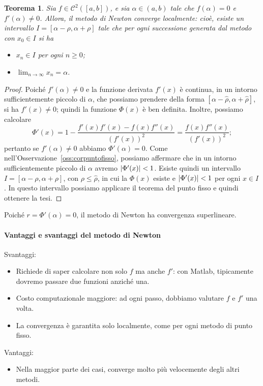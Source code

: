 \documentclass[a4paper]{report}
\DeclarePairedDelimiter{\abs}{\lvert}{\rvert}
\newtheorem{theorem}{Teorema}[chapter]
\theoremstyle{definiton}
\theoremstyle{remark}
\begin{document}
\begin{theorem}
Sia $f \in \mathcal{C}^2([a,b])$, e sia $\alpha \in (a,b)$ tale che $f(\alpha) = 0$ e $f'(\alpha) \neq 0$. Allora, il metodo di Newton converge localmente: cioè, esiste un intervallo $I = [\alpha - \rho,\alpha + \rho]$ tale che per ogni successione generata dal metodo con $x_0 \in I$ si ha
\begin{itemize}
    \item $x_n \in I$ per ogni $n\geq 0$;
    \item $\lim_{n\to \infty } x_n = \alpha$.
\end{itemize}
\end{theorem}
\begin{proof}
Poiché $f'(\alpha) \neq 0$ e la funzione derivata $f'(x)$ è continua, in un intorno sufficientemente piccolo di $\alpha$, che possiamo prendere della forma $[\alpha-\hat{\rho}, \alpha+\hat{\rho}]$, si ha $f'(x) \neq 0$; quindi la funzione $\Phi(x)$ è ben definita. Inoltre, possiamo calcolare
\begin{equation} \label{Phiprime}
    \Phi'(x) = 1 - \frac{f'(x)f'(x) - f(x)f''(x)}{(f'(x))^2} = \frac{f(x)f''(x)}{(f'(x))^2};
\end{equation}
pertanto se $f'(\alpha) \neq 0$ abbiamo $\Phi'(\alpha) = 0$. Come nell'Osservazione~\ref{oss:corpuntofisso}, possiamo affermare che in un intorno sufficientemente piccolo di $\alpha$ avremo $\abs{\Phi'(x)} < 1$. Esiste quindi un intervallo $I = [\alpha-\rho,\alpha+\rho]$, con $\rho\leq \hat{\rho}$, in cui la $\Phi(x)$ esiste e $\abs{\Phi'(x)} < 1$ per ogni $x\in I$. In questo intervallo possiamo applicare il teorema del punto fisso e quindi ottenere la tesi.
\end{proof}
Poiché $r = \Phi'(\alpha)=0$, il metodo di Newton ha convergenza superlineare.

\paragraph{Vantaggi e svantaggi del metodo di Newton}
Svantaggi:
\begin{itemize}
    \item Richiede di saper calcolare non solo $f$ ma anche $f'$: con Matlab, tipicamente dovremo passare due funzioni anziché una.
    \item Costo computazionale maggiore: ad ogni passo, dobbiamo valutare $f$ e $f'$ una volta.
    \item La convergenza è garantita solo localmente, come per ogni metodo di punto fisso.
\end{itemize}
Vantaggi:
\begin{itemize}
    \item Nella maggior parte dei casi, converge molto più velocemente degli altri metodi.
\end{itemize}
\end{document}
